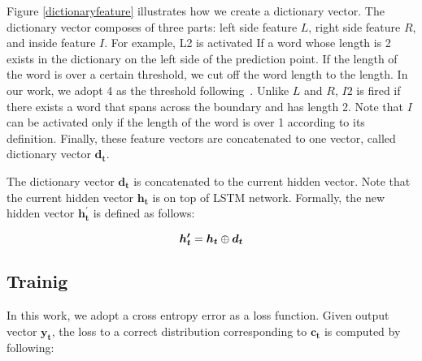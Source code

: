 \documentclass[11pt,letterpaper]{article}
\begin{document}
Figure \ref{dictionaryfeature} illustrates how we create a dictionary vector.
The dictionary vector composes of three parts: left side feature $L$, right side feature $R$, and inside feature $I$. For example, L2 is activated If a word whose length is 2 exists in the dictionary on the left side of the prediction point. If the length of the word is over a certain threshold, we cut off the word length to the length. In our work, we adopt 4 as the threshold following~.
Unlike $L$ and $R$, 
$I2$ is fired if there exists a word that spans across the boundary and has length 2. Note that $I$ can be activated only if the length of the word is over 1  according to its definition.
Finally, these feature vectors are concatenated to one vector, called dictionary vector $\bm{d_{t}}$.

The dictionary vector $\bm{d_{t}}$ is concatenated to the current hidden vector. 
Note that the current hidden vector  $\bm{h_{t}}$ is on top of LSTM network.
Formally, the new hidden vector $\bm{h^{\prime}_{t}}$ is defined as follows:

\begin{equation}  
\bm{h^{\prime}_{t}} = \bm{h_{t}} \oplus \bm{d_{t}}
\vspace{6pt}
 \end{equation}






\subsection{Trainig}
In this work, we adopt a cross entropy error as a loss function. Given output vector $\bm{y_{t}}$, the loss to a correct distribution corresponding to $\bm{c_{t}}$ is computed by following:
\end{document}
